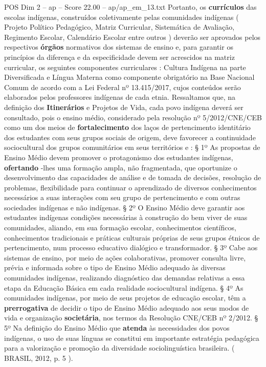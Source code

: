 \begin{textsample}{POS Dim 2 – ap – Score 22.00 – ap/ap\_em\_13.txt}
Portanto, os \textbf{currículos} das escolas indígenas, construídos coletivamente pelas comunidades indígenas ( Projeto Político Pedagógico, Matriz Curricular, Sistemática de Avaliação, Regimento Escolar, Calendário Escolar entre outros ) deverão ser aprovados pelos respectivos \textbf{órgãos} normativos dos sistemas de ensino e, para garantir os princípios da diferença e da especificidade devem ser acrescidos na matriz curricular, os seguintes componentes curriculares : Cultura Indígena na parte Diversificada e Língua Materna como componente obrigatório na Base Nacional Comum de acordo com a Lei Federal nº 13.415/2017, cujos conteúdos serão elaborados pelos professores indígenas de cada etnia.
Ressaltamos que, na definição dos \textbf{Itinerários} e Projetos de Vida, cada povo indígena deverá ser consultado, pois o ensino médio, considerado pela resolução nº 5/2012/CNE/CEB como um dos meios de \textbf{fortalecimento} dos laços de pertencimento identitário dos estudantes com seus grupos sociais de origem, deve favorecer a continuidade sociocultural dos grupos comunitários em seus territórios e : § 1º As propostas de Ensino Médio devem promover o protagonismo dos estudantes indígenas, \textbf{ofertando} -lhes uma formação ampla, não fragmentada, que oportunize o desenvolvimento das capacidades de análise e de tomada de decisões, resolução de problemas, flexibilidade para continuar o aprendizado de diversos conhecimentos necessários a suas interações com seu grupo de pertencimento e com outras sociedades indígenas e não indígenas. § 2º O Ensino Médio deve garantir aos estudantes indígenas condições necessárias à construção do bem viver de suas comunidades, aliando, em sua formação escolar, conhecimentos científicos, conhecimentos tradicionais e práticas culturais próprias de seus grupos étnicos de pertencimento, num processo educativo dialógico e transformador. § 3º Cabe aos sistemas de ensino, por meio de ações colaborativas, promover consulta livre, prévia e informada sobre o tipo de Ensino Médio adequado às diversas comunidades indígenas, realizando diagnóstico das demandas relativas a essa etapa da Educação Básica em cada realidade sociocultural indígena. § 4º As comunidades indígenas, por meio de seus projetos de educação escolar, têm a \textbf{prerrogativa} de decidir o tipo de Ensino Médio adequado aos seus modos de vida e organização \textbf{societária}, nos termos da Resolução CNE/CEB nº 2/2012. § 5º Na definição do Ensino Médio que \textbf{atenda} às necessidades dos povos indígenas, o uso de suas línguas se constitui em importante estratégia pedagógica para a valorização e promoção da diversidade sociolinguística brasileira. ( BRASIL, 2012, p. 5 ).

\end{textsample}
